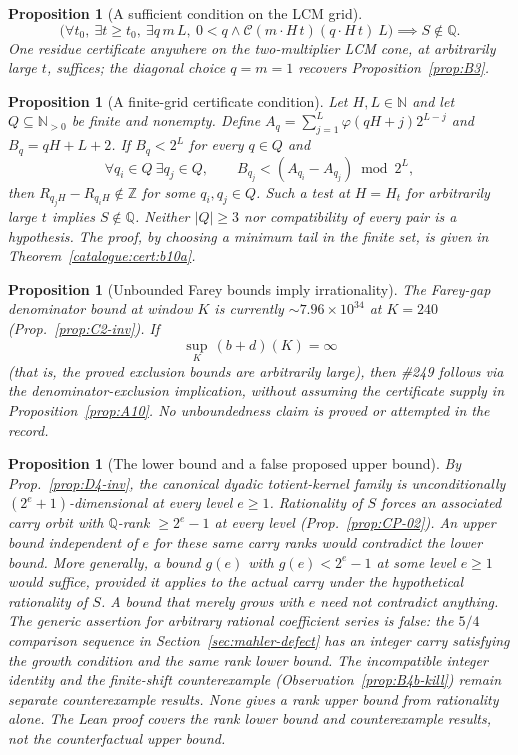 \documentclass[11pt]{article}
\theoremstyle{plain}
\newtheorem{prop}[thm]{Proposition}
\theoremstyle{definition}
\theoremstyle{remark}
\begin{document}
\begin{prop}[A sufficient condition on the LCM grid]\label{prop:B7}
\[
\big(\forall t_0,\ \exists t\ge t_0,\ \exists q\,m\,L,\ 0<q \wedge \mathcal{C}(m\cdot{H}\,t)(q\cdot{H}\,t)\ L\big)
\implies S\notin\mathbb Q.
\]
One residue certificate \emph{anywhere} on the two-multiplier LCM cone, at arbitrarily large $t$,
suffices; the diagonal choice $q=m=1$ recovers Proposition~\ref{prop:B3}.
\end{prop}


\begin{prop}[A finite-grid certificate condition]\label{prop:B10}
Let $H,L\in\mathbb N$ and let $Q\subseteq\mathbb N_{>0}$ be finite and
nonempty. Define $A_q=\sum_{j=1}^{L}\varphi(qH+j)2^{L-j}$ and
$B_q=qH+L+2$. If $B_q<2^L$ for every $q\in Q$ and
\[
 \forall q_i\in Q\ \exists q_j\in Q,\qquad
 B_{q_j}<(A_{q_i}-A_{q_j})\bmod2^L,
\]
then $R_{q_jH}-R_{q_iH}\notin\mathbb Z$ for some $q_i,q_j\in Q$.
Such a test at $H=H_t$ for arbitrarily large $t$ implies
$S\notin\mathbb Q$. Neither $|Q|\ge3$ nor compatibility of every
pair is a hypothesis. The proof, by choosing a minimum tail in the
finite set, is given in Theorem~\ref{catalogue:cert:b10a}.
\end{prop}

\begin{prop}[Unbounded Farey bounds imply irrationality]\label{prop:C2sup}
The Farey-gap denominator bound at window $K$ is currently $\sim 7.96\times10^{34}$ at $K=240$
(Prop.~\ref{prop:C2-inv}). If
\[
\sup_K\, (b+d)(K) = \infty
\]
(that is, the proved exclusion bounds are arbitrarily large), then \#249 follows via the denominator-exclusion implication, without assuming the certificate supply in Proposition~\ref{prop:A10}. No unboundedness claim is proved or attempted in the record.
\end{prop}

\begin{prop}[The lower bound and a false proposed upper bound]\label{prop:D5cons}
By Prop.~\ref{prop:D4-inv}, the canonical dyadic totient-kernel family is unconditionally
$(2^e+1)$-dimensional at every level $e\ge1$. Rationality of $S$ forces an associated
carry orbit with $\mathbb Q$-rank $\ge 2^e-1$ at every level (Prop.~\ref{prop:CP-02}). An upper bound independent of $e$ for these same carry ranks would
contradict the lower bound. More generally, a bound $g(e)$ with
$g(e)<2^e-1$ at some level $e\ge1$ would suffice, provided it applies to the
actual carry under the hypothetical rationality of $S$. A bound that
merely grows with $e$ need not contradict anything. The generic assertion
for arbitrary rational coefficient series is false: the $5/4$ comparison
sequence in Section~\ref{sec:mahler-defect} has an integer carry satisfying
the growth condition and the same rank lower bound. The incompatible
integer identity and the finite-shift counterexample (Observation~\ref{prop:B4b-kill}) remain
separate counterexample results. None gives a rank upper bound from rationality alone.
The Lean proof covers the rank lower bound and counterexample results,
not the counterfactual upper bound.
\end{prop}
\end{document}
